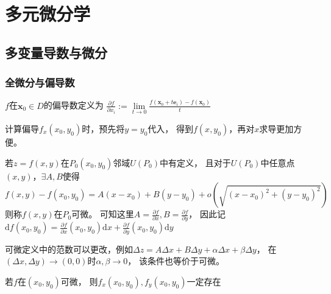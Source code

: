 


\chapter{多元微分学}

\section{多变量导数与微分}

\subsection{全微分与偏导数}


\begin{definition}[偏导数]
  $f$在$\mathbf{x}_0 \in D$的偏导数定义为
  $\frac{\partial f}{\partial x_i} := \lim \limits_{t \rightarrow 0} \frac{f(\mathbf{x}_0 + t \mathbf{e}_i) - f(\mathbf{x}_0)}{t}$
\end{definition}

\begin{note}
  计算偏导$f_x(x_0,y_0)$时，预先将$y = y_0$代入，
  得到$f(x,y_0)$，再对$x$求导更加方便。
\end{note}

\begin{definition}[可微]
  若$z = f(x,y)$在$P_0(x_0,y_0)$邻域$U(P_0)$中有定义，
  且对于$U(P_0)$中任意点$(x,y)$，$\exists A,B$使得
  \begin{equation*}
    f(x,y) - f(x_0,y_0) = A(x - x_0) + B(y - y_0) + o(\sqrt{(x - x_0)^2 + (y - y_0)^2})
  \end{equation*}
  则称$f(x,y)$在$P_0$可微。
  可知这里$A = \frac{\partial f}{\partial x}, B = \frac{\partial f}{\partial y}$，
  因此记$\mathrm{d} f(x_0,y_0) = \frac{\partial f}{\partial x}(x_0,y_0)\mathrm{d} x + \frac{\partial f}{\partial y}(x_0,y_0) \mathrm{d} y$
\end{definition}

\begin{note}
  可微定义中的范数可以更改，例如$\Delta z = A \Delta x + B \Delta y + \alpha \Delta x + \beta \Delta y$，
  在$(\Delta x, \Delta y)\rightarrow (0,0)$时$\alpha,\beta \rightarrow 0$，
  该条件也等价于可微。
\end{note}

\begin{corollary}[偏导与可微]
  若$f$在$(x_0,y_0)$可微，
  则$f_x(x_0,y_0), f_y(x_0,y_0)$一定存在
\end{corollary}

